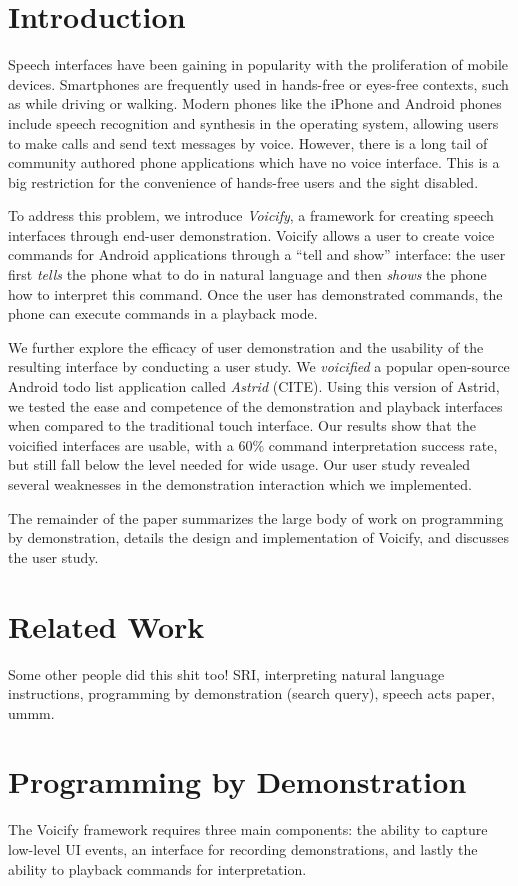 \documentclass[letterpaper]{article}
\begin{document}
\section{Introduction}
Speech interfaces have been gaining in popularity with the proliferation of mobile devices. Smartphones are
frequently used in hands-free or eyes-free contexts, such as while driving or walking. Modern phones like
the iPhone and Android phones include speech recognition and synthesis in the operating system, allowing
users to make calls and send text messages by voice. However, there is a long tail of community authored
phone applications which have no voice interface. This is a big restriction for the convenience of
hands-free users and the sight disabled. 

To address this problem, we introduce \emph{Voicify}, a framework for creating speech interfaces 
through end-user demonstration. Voicify allows a user to create voice commands for Android
applications through a ``tell and show'' interface: the user first \emph{tells} the phone what 
to do in natural language and then \emph{shows} the phone how to interpret this command.
Once the user has demonstrated commands, the phone can execute commands in a playback mode.

We further explore the efficacy of user demonstration and the usability of the resulting
interface by conducting a user study.  We \emph{voicified} a popular open-source Android todo list
application called \emph{Astrid} (CITE). Using this version of Astrid, we tested the ease and
competence of the demonstration and playback interfaces when compared to the traditional touch
interface. Our results show that the voicified interfaces are usable, with a 60\% command interpretation
success rate, but still fall below the level needed for wide usage. Our user study revealed
several weaknesses in the demonstration interaction which we implemented.

The remainder of the paper summarizes the large body of work on programming by demonstration, details
the design and implementation of Voicify, and discusses the user study.

\section{Related Work}
Some other people did this shit too!
SRI, interpreting natural language instructions, programming by demonstration (search query), 
speech acts paper, ummm.

\section{Programming by Demonstration}
The Voicify framework requires three main components: the ability to capture low-level UI events, 
an interface for recording demonstrations, and lastly the ability to playback commands for interpretation.
\end{document}
